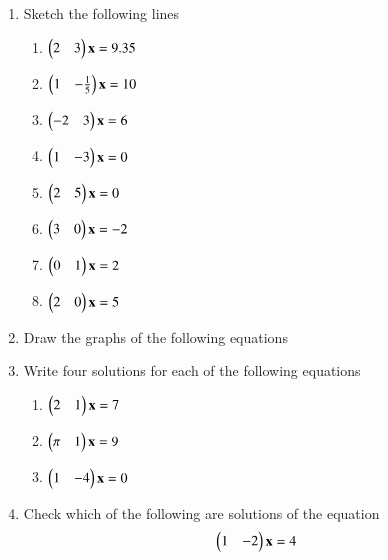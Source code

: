 \begin{enumerate}[label=\arabic*.,ref=\thesubsection.\theenumi]
\item Sketch the following lines
%
\begin{enumerate}[itemsep=2pt]
\item
$
\begin{pmatrix}2 & 3 \end{pmatrix}\mathbf{x}=9.35
$
\item
$
\begin{pmatrix}1 & -\frac{1}{5} \end{pmatrix}\mathbf{x}=10
$
\item
$
\begin{pmatrix}-2 & 3 \end{pmatrix}\mathbf{x}=6
$
\item
$
\begin{pmatrix}1 & -3 \end{pmatrix}\mathbf{x}=0
$
\item
$
\begin{pmatrix}2 & 5 \end{pmatrix}\mathbf{x}=0
$
\item
$
\begin{pmatrix}3 & 0 \end{pmatrix}\mathbf{x}=-2
$
\item
$
\begin{pmatrix}0 & 1 \end{pmatrix}\mathbf{x}=2
$
\item
$
\begin{pmatrix}2 & 0 \end{pmatrix}\mathbf{x}=5
$
\end{enumerate}
%
\solution 

%
\item Draw the graphs of the following equations
\begin{enumerate}[itemsep=2pt]
\end{enumerate}
\solution 

%
\item Write four solutions for each of the following equations
\begin{enumerate}
\item $\begin{pmatrix}2 & 1\end{pmatrix}\mathbf{x} = 7$
\item $\begin{pmatrix} \pi & 1\end{pmatrix}\mathbf{x}  = 9 $
\item $\begin{pmatrix} 1 & -4\end{pmatrix}\mathbf{x}  = 0$
\end{enumerate}
\solution 

%
\item Check which of the following are solutions of the equation 
%
\begin{align}
\begin{pmatrix}1 & -2\end{pmatrix}\mathbf{x} &= 4
\end{align}

\end{enumerate}
